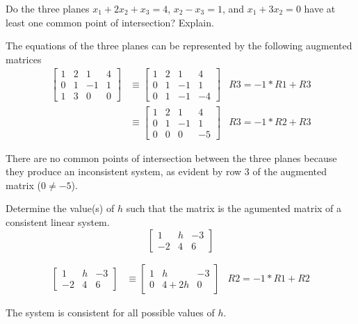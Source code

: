 \documentclass{../mathhomework}
\begin{document}
\begin{problem}[1.1\#18]
    Do the three planes $x_1 + 2x_2 + x_3 = 4$, $x_2 - x_3 = 1$, and $x_1 + 3x_2 = 0$ have at least one common point of intersection? Explain.

    \begin{solution}
        The equations of the three planes can be represented by the following augmented matrices
        \begin{align*}
            \begin{bmatrix}
                1 & 2 & 1 & 4 \\
                0 & 1 & -1 & 1 \\
                1 & 3 & 0 & 0
            \end{bmatrix}
            & \equiv
            \begin{bmatrix}
                1 & 2 & 1 & 4 \\
                0 & 1 & -1 & 1 \\
                0 & 1 & -1 & -4
            \end{bmatrix}
            & R3 = -1 * R1 + R3 \\ & \equiv
            \begin{bmatrix}
                1 & 2 & 1 & 4 \\
                0 & 1 & -1 & 1 \\
                0 & 0 & 0 & -5
            \end{bmatrix}
            & R3 = -1 * R2 + R3
        \end{align*}

        There are no common points of intersection between the three planes because they produce an inconsistent system, as evident by row 3 of the augmented matrix ($0 \neq -5$).
    \end{solution}
\end{problem}

\pagebreak
\begin{problem}[1.1\#20]
    Determine the value(s) of $h$ such that the matrix is the agumented matrix of a consistent linear system.
    $$\begin{bmatrix}
        1 & h & -3 \\
        -2 & 4 & 6
    \end{bmatrix}$$

    \begin{solution}
        \begin{align*}
            \begin{bmatrix}
                1 & h & -3 \\
                -2 & 4 & 6
            \end{bmatrix}
            & \equiv
            \begin{bmatrix}
                1 & h & -3 \\
                0 & 4+2h & 0
            \end{bmatrix}
            & R2 = -1 * R1 + R2
        \end{align*}

        The system is consistent for all possible values of $h$.
    \end{solution}
\end{problem}
\end{document}
